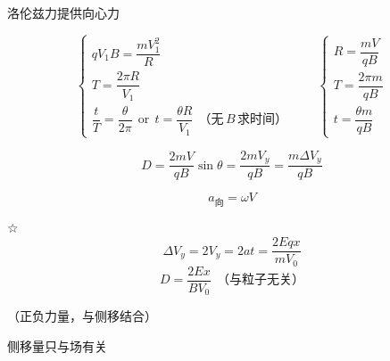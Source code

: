 洛伦兹力提供向心力

\[
\begin{cases}qV_1B=\dfrac{mV_1^{2}}{R}\\[6pt] T=\dfrac{2\pi R}{V_1}\\[6pt] \dfrac{t}{T}=\dfrac{\theta}{2\pi}\ \ \text{or}\ \ t=\dfrac{\theta R}{V_1}\ \ \text{（无}\,B\,\text{求时间）}\end{cases}
\qquad
\begin{cases}R=\dfrac{mV}{qB}\\[6pt] T=\dfrac{2\pi m}{qB}\\[6pt] t=\dfrac{\theta m}{qB}\end{cases}
\]

\[ D=\frac{2mV}{qB}\sin\theta=\frac{2mV_y}{qB}=\frac{m\Delta V_y}{qB} \]

\[ a_{\text{向}}=\omega V \]

☆\ 
\[ \Delta V_y=2V_y=2at=\frac{2Eqx}{mV_0} \]
\[ D=\frac{2Ex}{BV_0}\ \ \text{（与粒子无关）} \]

（正负力量，与侧移结合）

侧移量只与场有关

